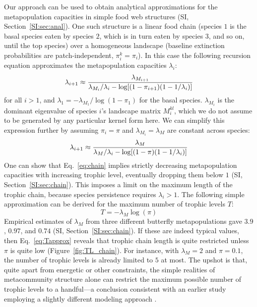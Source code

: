 \documentclass[11pt]{article}
\newcommand{\SI}{SI}
\let\originalleft\left
\let\originalright\right
\renewcommand{\left}{\mathopen{}\mathclose\bgroup\originalleft}
\renewcommand{\right}{\aftergroup\egroup\originalright}
\begin{document}
Our approach can be used to obtain analytical approximations for the metapopulation capacities in simple food web structures (\SI, Section~\ref{SI:sec:anal}). One such structure is a linear food chain (species $1$ is the basal species eaten by species $2$, which is in turn eaten by species $3$, and so on, until the top species) over a homogeneous landscape (baseline extinction probabilities are patch-independent, $\pi_i^k = \pi_i$). In this case the following recursion equation approximates the metapopulation capacities $\lambda_i$:
\begin{equation}
  \label{eq:chain_full}
  \lambda_{i+1} \approx \frac{\lambda_{M_{i+1}}}{\lambda_{M_i} / \lambda_i
    - \log \left[ (1 - \pi_{i+1}) (1-1/\lambda_i) \right]}
\end{equation}
for all $i > 1$, and $\lambda_1 = -\lambda_{M_1} / \log(1-\pi_1)$ for the basal species. $\lambda_{M_{i}}$ is the dominant eigenvalue of species $i$'s landscape matrix $M_i^{kl}$, which we do not assume to be generated by any particular kernel form here. We can simplify this expression further by assuming $\pi_i = \pi$ and $\lambda_{M_i} = \lambda_M$ are constant across species:
\begin{equation}
  \label{eq:chain}
  \lambda_{i+1} \approx \frac{\lambda_M}{\lambda_M / \lambda_i
    - \log \left[ (1 - \pi) (1-1/\lambda_i) \right]}
\end{equation}
One can show that Eq.~\ref{eq:chain} implies strictly decreasing metapopulation capacities with increasing trophic level, eventually dropping them below $1$ (\SI, Section~\ref{SI:sec:chain}). This imposes a limit on the maximum length of the trophic chain, because species persistence requires $\lambda_i > 1$. The following simple approximation can be derived for the maximum number of trophic levels $T$:
\begin{equation}
  \label{eq:Tapprox}
  T = -\lambda_M \log(\pi)
\end{equation}
Empirical estimates of $\lambda_M$ from three different butterfly metapopulations \citep{Hanski1994} gave $3.9$, $0.97$, and $0.74$ (\SI, Section~\ref{SI:sec:chain}). If these are indeed typical values, then Eq.~\ref{eq:Tapprox} reveals that trophic chain length is quite restricted unless $\pi$ is quite low (Figure~\ref{fig:TL_chain}). For instance, with $\lambda_M=2$ and $\pi=0.1$, the number of trophic levels is already limited to $5$ at most. The upshot is that, quite apart from energetic or other constraints, the simple realities of metacommunity structure alone can restrict the maximum possible number of trophic levels to a handful---a conclusion consistent with an earlier study employing a slightly different modeling approach \citep{Calcagnoetal2011}.
\end{document}

